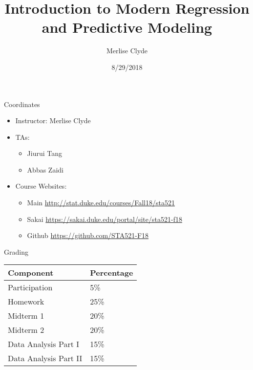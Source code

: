 \documentclass[ignorenonframetext,]{beamer}
\title{Introduction to Modern Regression and Predictive Modeling}
\author{Merlise Clyde}
\date{8/29/2018}
\providecommand{\tightlist}{%
  \setlength{\itemsep}{0pt}\setlength{\parskip}{0pt}}
\begin{document}
\frame{\titlepage}

\begin{frame}{Coordinates}
\protect\hypertarget{coordinates}{}

\begin{itemize}[<+->]
\tightlist
\item
  Instructor: Merlise Clyde
\item
  TAs:

  \begin{itemize}[<+->]
  \tightlist
  \item
    Jiurui Tang
  \item
    Abbas Zaidi
  \end{itemize}
\item
  Course Websites:

  \begin{itemize}[<+->]
  \tightlist
  \item
    Main \url{http://stat.duke.edu/courses/Fall18/sta521}
  \item
    Sakai \url{https://sakai.duke.edu/portal/site/sta521-f18}
  \item
    Github \url{https://github.com/STA521-F18}
  \end{itemize}
\end{itemize}

\end{frame}

\begin{frame}{Grading}
\protect\hypertarget{grading}{}

\begin{longtable}[]{@{}ll@{}}
\toprule
Component & Percentage\tabularnewline
\midrule
\endhead
Participation & 5\%\tabularnewline
Homework & 25\%\tabularnewline
Midterm 1 & 20\%\tabularnewline
Midterm 2 & 20\%\tabularnewline
Data Analysis Part I & 15\%\tabularnewline
Data Analysis Part II & 15\%\tabularnewline
\bottomrule
\end{longtable}

\end{frame}
\end{document}

